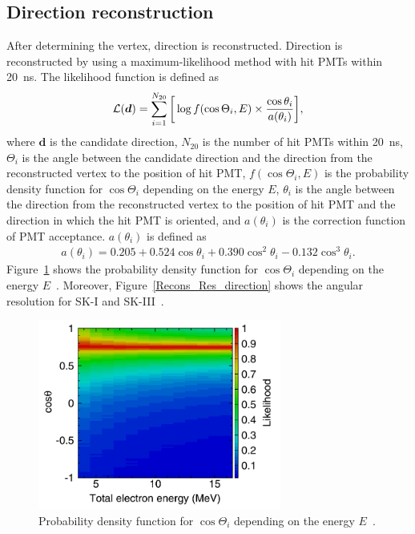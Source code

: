 \subsection{Direction reconstruction}\label{Subsec_direction_rec}
\vs\hs
After determining the vertex, direction is reconstructed.
Direction is reconstructed by using a maximum-likelihood method with hit PMTs within 20~ns.
The likelihood function is defined as
\begin{eqnarray}
	\mathcal{L}(\bm{d}) = \sum_{i=1}^{N_{20}} \bigg[\log f(\cos\Theta_{i},E) \times {\cos\theta_{i} \over a(\theta_{i})}\bigg],
\end{eqnarray}
where $\bm{d}$ is the candidate direction, $N_{20}$ is the number of hit PMTs within 20~ns, $\Theta_{i}$ is the angle between the candidate direction and the direction from the reconstructed vertex to the position of hit PMT, $f(\cos\Theta_{i},E)$ is the probability density function for $\cos\Theta_{i}$ depending on the energy $E$, $\theta_{i}$ is the angle between the direction from the reconstructed vertex to the position of hit PMT and the direction in which the hit PMT is oriented, and $a(\theta_{i})$ is the correction function of PMT acceptance.
$a(\theta_{i})$ is defined as
\begin{eqnarray}\label{Recons_Eq_a_theta}
	a(\theta_{i}) = 0.205 + 0.524\cos\theta_{i} + 0.390\cos^{2}\theta_{i} - 0.132\cos^{3}\theta_{i}.
\end{eqnarray}
Figure~\ref{Recons_PDF_direction} shows the probability density function for $\cos\Theta_{i}$ depending on the energy $E$~\cite{2011Abe}.
Moreover, Figure~\ref{Recons_Res_direction} shows the angular resolution for SK-I and SK-III~\cite{2011Abe}.

\begin{figure}[tbp]
	\centering
	\includegraphics[width=8cm]{Figures/Reconstruction/PDF_direction}
	\caption[Probability density function for $\cos\Theta_{i}$ depending on the energy $E$]{
	Probability density function for $\cos\Theta_{i}$ depending on the energy $E$~\cite{2011Abe}.
	}\label{Recons_PDF_direction}
\end{figure}

